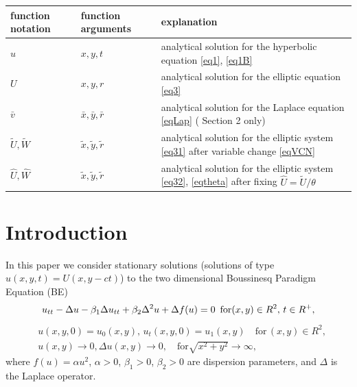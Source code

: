 \documentclass[12pt]{article}
\theoremstyle{theorem}
\theoremstyle{defi}
\begin{document}
\begin{center}
\begin{table}[ht]
		\begin{tabular}{|C{1.6cm}|C{1.9cm}|C{7.3cm}|}
   			\hline
			\hline
    function notation  & function arguments   &  explanation  \\
               	 \hline
    $u$          & $x,y,t$                            &  analytical solution for the hyperbolic equation \eqref{eq1}, \eqref{eq1B} \\
			\hline 	
      $U$        &   $x, y, r$                           & analytical solution for the elliptic equation \eqref{eq3} \\
			\hline 	
      $\bar v$        &  $\bar x, \bar y, \bar r$  & analytical solution for the Laplace equation \eqref{eqLap} ( Section 2 only)  \\
			\hline 	
     $\tilde U, \tilde W$ & $ \tilde x, \tilde y, \tilde r$  &  analytical solution for the elliptic system \eqref{eq31} after variable change \eqref{eqVCN} \\
			\hline 	
     $\widehat U, \widehat W$ & $\tilde x, \tilde y, \tilde r$  &  analytical solution for the elliptic system \eqref{eq32}, \eqref{eqtheta} after fixing $ \widehat U = \tilde U / \theta $ \\
		   \hline
	          \hline
		\end{tabular}
\end{table}
\end{center}

\section{Introduction}

In this paper we consider stationary solutions (solutions of type  $u(x,y,t)=U(x,y - ct)$) to the two dimensional Boussinesq Paradigm Equation (BE)
\begin{equation}
u_{tt} - \Delta u -\beta_1  \Delta u_{tt} +\beta_2 \Delta ^2 u + \Delta f(u)=0 \enskip \text{for} (x,y) \in R^2, \, t\in R^+ ,\label{eq1}
\end{equation}
\begin{equation}\label{eq1B}
\begin{split}
&u(x,y,0)=u_0(x,y), \, u_t(x,y,0)=u_1(x,y)   \quad\text{for} \, (x,y) \in R^2, \\
&u(x,y) \rightarrow 0,  \Delta u(x,y) \rightarrow 0 ,  \quad \text{for}  \sqrt{x^2 + y^2} \rightarrow \infty,
\end{split}
\end{equation}
where   $f(u)=\alpha u^2$,  $\alpha>0$, $\beta_1>0$, $\beta_2>0$  are dispersion parameters, and $\Delta$ is the Laplace operator.
\end{document}
